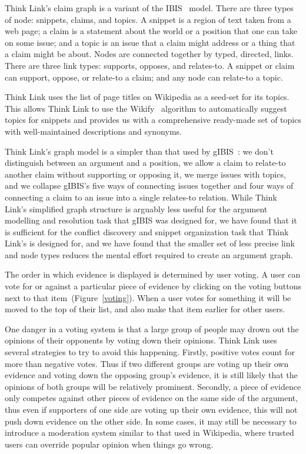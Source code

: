 \documentclass{chi2009}
\newcommand{\todo}[1]{}
\begin{document}

Think Link's claim graph is a variant of the IBIS~\cite{Rittel1973} model. There are three types of node: snippets, claims, and topics. A snippet is a region of text taken from a web page; a claim is a statement about the world or a position that one can take on some issue; and a topic is an issue that a claim might address or a thing that a claim might be about. Nodes are connected together by typed, directed, links. There are three link types: supports, opposes, and relates-to. A snippet or claim can support, oppose, or relate-to a claim; and any node can relate-to a topic. 

Think Link uses the list of page titles on Wikipedia as a seed-set for its topics. This allows Think Link to use the Wikify~\cite{Mihalcea2007} algorithm to automatically suggest topics for snippets and provides us with a comprehensive ready-made set of topics with well-maintained descriptions and synonyms.

Think Link's graph model is a simpler than that used by gIBIS~\cite{Conklin1987}: we don't distinguish between an argument and a position, we allow a claim to relate-to another claim without supporting or opposing it, we merge issues with topics, and we collapse gIBIS's five ways of connecting issues together and four ways of connecting a claim to an issue into a single relates-to relation. While Think Link's simplified graph structure is arguably less useful for the argument modelling and resolution task that gIBIS was designed for, we have found that it is sufficient for the conflict discovery and snippet organization task that Think Link's is designed for, and we have found that the smaller set of less precise link and node types reduces the mental effort required to create an argument graph.

The order in which evidence is displayed is determined by user voting. A user can vote for or against a particular piece of evidence by clicking on the voting buttons next to that item~(Figure~\ref{voting}). When a user votes for something it will be moved to the top of their list, and also make that item earlier for other users.

One danger in a voting system is that a large group of people may drown out the opinions of their opponents by voting down their opinions. Think Link uses several strategies to try to avoid this happening. Firstly, positive votes count for more than negative votes. Thus if two different groups are voting up their own evidence and voting down the opposing group's evidence, it is still likely that the opinions of both groups will be relatively prominent. Secondly, a piece of evidence only competes against other pieces of evidence on the same side of the argument, thus even if supporters of one side are voting up their own evidence, this will not push down evidence on the other side. In some cases, it may still be necessary to introduce a moderation system similar to that used in Wikipedia, where trusted users can override popular opinion when things go wrong.
\end{document}
